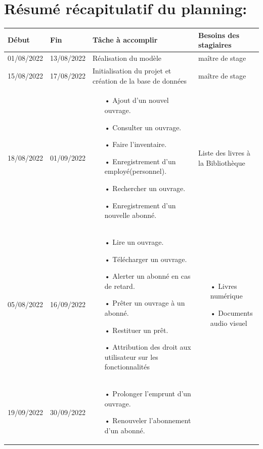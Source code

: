 \documentclass[12pt,a4paper]{article}
\begin{document}
\section{Résumé récapitulatif du planning:}
\begin{center}
\begin{tabular}{|p{2.2cm}|p{2.2cm}|p{6.5cm}|p{6.5cm}|}
\hline 
\textbf{Début} & \textbf{Fin} & \textbf{Tâche à accomplir} & \textbf{Besoins des stagiaires} \\ 
\hline 
01/08/2022 & 13/08/2022 & Réalisation du modèle & maître de stage\\ 
\hline 
15/08/2022 & 17/08/2022 & Initialisation du projet et création de la base de données & maître de stage \\ 
\hline
18/08/2022 & 01/09/2022 & \begin{itemize}
\item[•] Ajout d'un nouvel ouvrage.
\item[•] Consulter un ouvrage.
\item[•] Faire l'inventaire.
\item[•] Enregistrement d'un employé(personnel).
\item[•] Rechercher un ouvrage.
\item[•] Enregistrement d'un nouvelle abonné.
\end{itemize} & Liste des livres à la Bibliothèque \\ 
\hline 
05/08/2022 & 16/09/2022 & \begin{itemize}
\item[•] Lire un ouvrage.
\item[•] Télécharger un ouvrage.
\item[•] Alerter un abonné en cas de retard.
\item[•] Prêter un ouvrage à un abonné.
\item[•] Restituer un prêt.
\item[•] Attribution des droit aux utilisateur sur les fonctionnalités
\end{itemize} & 
\begin{itemize}
\item[•] Livres numérique
\item[•] Documents audio visuel
\end{itemize} \\
\hline 
19/09/2022 & 30/09/2022 & \begin{itemize}
\item[•] Prolonger l'emprunt d'un ouvrage.
\item[•] Renouveler l'abonnement d'un abonné.

\end{itemize}
\end{tabular}
\end{center}
\end{document}
